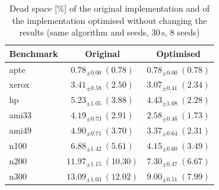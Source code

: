 \begin{table}
\centering
\small
\begin{tabular}{@{}lcc@{}}
\toprule
Benchmark & Original & Optimised \\
\midrule
apte & $0.78_{\pm 0.00}\ (0.78)$ & $0.78_{\pm 0.00}\ (0.78)$ \\
xerox & $3.41_{\pm 0.58}\ (2.50)$ & $3.07_{\pm 0.41}\ (2.34)$ \\
hp & $5.23_{\pm 1.05}\ (3.88)$ & $4.43_{\pm 1.08}\ (2.28)$ \\
ami33 & $4.19_{\pm 0.73}\ (2.91)$ & $\mathbf{2.58_{\pm 0.46}\ (1.73)}$ \\
ami49 & $4.90_{\pm 0.71}\ (3.70)$ & $\mathbf{3.37_{\pm 0.64}\ (2.31)}$ \\
n100 & $6.88_{\pm 1.42}\ (5.61)$ & $\mathbf{4.15_{\pm 0.60}\ (3.49)}$ \\
n200 & $11.97_{\pm 1.15}\ (10.30)$ & $\mathbf{7.30_{\pm 0.47}\ (6.67)}$ \\
n300 & $13.09_{\pm 1.03}\ (12.02)$ & $\mathbf{9.00_{\pm 0.51}\ (7.99)}$ \\
\bottomrule
\end{tabular}
\caption{Dead space [\%] of the original implementation and of the implementation optimised without changing the results (same algorithm and seeds, 30\,s, 8 seeds)}
\label{tab:rq1quality}
\end{table}
